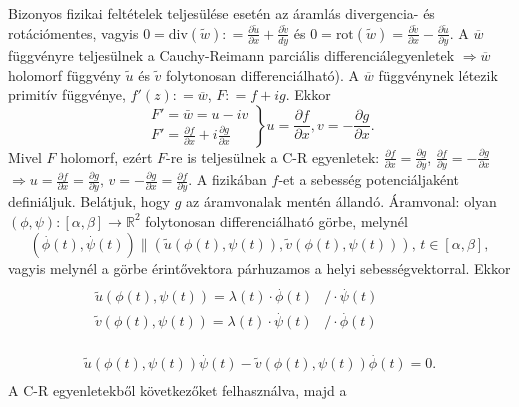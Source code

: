 \documentclass[12pt,a4paper]{scrartcl}
\begin{document}
Bizonyos fizikai feltételek teljesülése esetén az áramlás divergencia-
és rotációmentes, vagyis
\(0 = {\text{div}}\left( {\tilde w} \right): = \frac{{\partial \tilde u}}{{\partial x}} + \frac{{\partial \tilde v}}{{dy}}\)
és
\(0 = {\text{rot}}\left( {\tilde w} \right) = \frac{{\partial \tilde v}}{{\partial x}} - \frac{{\partial \tilde u}}{{\partial y}}.\)
A \(\overline{w}\) függvényre teljesülnek a Cauchy-Reimann parciális
differenciálegyenletek \(\left. \Rightarrow\overline{w} \right.\)
holomorf függvény \(\widetilde{u}\) és \(\widetilde{v}\) folytonosan
differenciálható). A \(\overline{w}\) függvénynek létezik primitív
függvénye, \(f'\left( z \right): = \overline{w}\), \(F: = f + ig\).
Ekkor \[\left. {\begin{array}{*{20}{l}}
  {F' = \bar w = u - iv} \\ 
  {F' = \frac{{\partial f}}{{\partial x}} + i\frac{{\partial g}}{{\partial x}}} 
\end{array}} \right\}u = \frac{{\partial f}}{{\partial x}},v =  - \frac{{\partial g}}{{\partial x}}.\]
Mivel \(F\) holomorf, ezért \(F\)-re is teljesülnek a C-R egyenletek:
\(\frac{\partial f}{\partial x} = \frac{\partial g}{\partial y}\),
\(\frac{\partial f}{\partial y} = - \frac{\partial g}{\partial x}\)
\(\left. \Rightarrow u = \frac{\partial f}{\partial x} = \frac{\partial g}{\partial y},\, v = - \frac{\partial g}{\partial x} = \frac{\partial f}{\partial y} \right.\).
A fizikában \(f\)-et a sebesség potenciáljaként definiáljuk. Belátjuk,
hogy \(g\) az áramvonalak mentén állandó. Áramvonal: olyan
\(\left. \left( {\phi,\psi} \right):\left\lbrack {\alpha,\beta} \right\rbrack\rightarrow{\mathbb{R}}^{2} \right.\)
folytonosan differenciálható görbe, melynél
\[\left( {\overset{.}{\phi}\left( t \right),\overset{.}{\psi}\left( t \right)} \right) \parallel \left( {\widetilde{u}\left( {\phi\left( t \right),\psi\left( t \right)} \right),\widetilde{v}\left( {\phi\left( t \right),\psi\left( t \right)} \right)} \right),\, t \in {\left\lbrack {\alpha,\beta} \right\rbrack,}\]vagyis
melynél a görbe érintővektora párhuzamos a helyi sebességvektorral.
Ekkor \[\begin{array}{l}
\begin{array}{l}
\begin{array}{ll}
{\widetilde{u}\left( {\phi\left( t \right),\psi\left( t \right)} \right) = \lambda\left( t \right) \cdot \overset{.}{\phi}\left( t \right)} & {/ \cdot \overset{.}{\psi}\left( t \right)} \\
{\widetilde{v}\left( {\phi\left( t \right),\psi\left( t \right)} \right) = \lambda\left( t \right) \cdot \overset{.}{\psi}\left( t \right)} & {/ \cdot \overset{.}{\phi}\left( t \right)} \\
\end{array} \\
\end{array} \\
{\widetilde{u}\left( {\phi\left( t \right),\psi\left( t \right)} \right)\overset{.}{\psi}\left( t \right) - \widetilde{v}\left( {\phi\left( t \right),\psi\left( t \right)} \right)\overset{.}{\phi}\left( t \right) = 0.} \\
\end{array}\] A C-R egyenletekből következőket felhasználva, majd a
\end{document}
